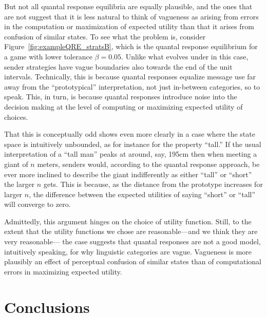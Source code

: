 \documentclass[fleqn,reqno,10pt]{article}
\newcommand{\rdd}{\acro{rdd}} %
\newcommand{\toler}{\ensuremath{\beta}} %
\begin{document}
But not all quantal response equilibria are equally plausible, and the
ones that are not suggest that it is less natural to think of
vagueness as arising from errors in the computation or maximization of
expected utility than that it arises from confusion of similar
states. To see what the problem is, consider
Figure~\ref{fig:exampleQRE_stratsB}, which is the quantal response
equilibrium for a game with lower tolerance $\toler = 0.05$. Unlike
what evolves under \rdd in this case, sender strategies have vague
boundaries also towards the end of the unit intervals. Technically,
this is because quantal responses equalize message use far away from
the ``prototypical'' interpretation, not just in-between categories,
so to speak. This, in turn, is because quantal responses introduce
noise into the decision making at the level of computing or maximizing
expected utility of choices.

That this is conceptually odd shows even more clearly in a case where
the state space is intuitively unbounded, as for instance for the
property ``tall.'' If the usual interpretation of a ``tall man'' peaks
at around, say, 195cm then when meeting a giant of $n$ meters, senders
would, according to the quantal response approach, be ever more
inclined to describe the giant indifferently as either ``tall'' or
``short'' the larger $n$ gets. This is because, as the distance from
the prototype increases for larger $n$, the difference between the
expected utilities of saying ``short'' or ``tall'' will converge to
zero. 

Admittedly, this argument hinges on the choice of utility
function. Still, to the extent that the utility functions we chose are
reasonable---and we think they are very reasonable--- the case
suggests that quantal responses are not a good model, intuitively
speaking, for why linguistic categories are vague. Vagueness is more
plausibly an effect of perceptual confusion of similar states than of
computational errors in maximizing expected utility.


\section{Conclusions}
\label{sec:conclusions}
\end{document}
